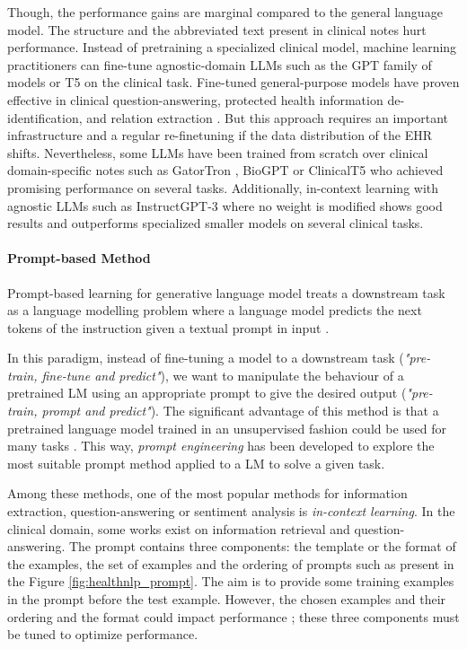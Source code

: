 Though, the performance gains are marginal compared to the general language model. The structure and the abbreviated text present in clinical notes hurt performance.
Instead of pretraining a specialized clinical model, machine learning practitioners can fine-tune agnostic-domain LLMs such as the GPT family of models or T5 on the clinical task. Fine-tuned general-purpose models have proven effective in clinical question-answering, protected health information de-identification, and relation extraction \citep{Lehman2023DoModels}. But this approach requires an important infrastructure and a regular re-finetuning if the data distribution of the EHR shifts. Nevertheless, some LLMs have been trained from scratch over clinical domain-specific notes such as GatorTron \citep{Yang2022ARecords}, BioGPT \citep{Luo2022BioGPT:Mining} or ClinicalT5 \citep{Lu2022ClinicalT5:Text} who achieved promising performance on several tasks.
Additionally, in-context learning with agnostic LLMs such as InstructGPT-3 \citep{Ouyang2022TrainingFeedback} where no weight is modified shows good results \citep{Agrawal2022LargeExtractors, Brown2020LanguageLearners} and outperforms specialized smaller models on several clinical tasks.

\paragraph{Prompt-based Method}
Prompt-based learning for generative language model treats a downstream task as a language modelling problem where a language model predicts the next tokens of the instruction given a textual prompt in input \citep{Sainz2021LabelExtraction}.

In this paradigm, instead of fine-tuning a model to a downstream task (\textit{"pre-train, fine-tune and predict"}), we want to manipulate the behaviour of a pretrained LM using an appropriate prompt to give the desired output (\textit{"pre-train, prompt and predict"}). The significant advantage of this method is that a pretrained language model trained in an unsupervised fashion could be used for many tasks \citep{Liu2023Pre-trainProcessing}.
This way, \textit{prompt engineering} has been developed to explore the most suitable prompt method applied to a LM to solve a given task.

Among these methods, one of the most popular methods for information extraction, question-answering or sentiment analysis is \textit{in-context learning}. In the clinical domain, some works exist on information retrieval and question-answering. The prompt contains three components: the template or the format of the examples, the set of examples and the ordering of prompts such as present in the Figure \ref{fig:healthnlp_prompt}. The aim is to provide some training examples in the prompt before the test example. However, the chosen examples and their ordering and the format could impact performance \citep{Zhao2021CalibrateModelsb}; these three components must be tuned to optimize performance.

